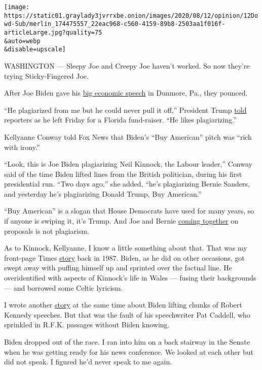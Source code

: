 \texttt{[image: https://static01.graylady3jvrrxbe.onion/images/2020/08/12/opinion/12Dowd-Sub/merlin\_174475557\_22eac968-c560-4159-89b8-2503aa1f016f-articleLarge.jpg?quality=75\\\&auto=webp\\\&disable=upscale]}

WASHINGTON --- Sleepy Joe and Creepy Joe haven't worked. So now they're
trying Sticky-Fingered Joe.

After Joe Biden gave his
\href{https://www.nytimes3xbfgragh.onion/2020/07/09/us/politics/biden-buy-american.html}{big
economic speech} in Dunmore, Pa., they pounced.

``He plagiarized from me but he could never pull it off,'' President
Trump
\href{https://twitter.com/CBSNews/status/1281615665242214403?s=20}{told}
reporters as he left Friday for a Florida fund-raiser. ``He likes
plagiarizing.''

Kellyanne Conway told Fox News that Biden's ``Buy American'' pitch was
``rich with irony.''

``Look, this is Joe Biden plagiarizing Neil Kinnock, the Labour
leader,'' Conway said of the time Biden lifted lines from the British
politician, during his first presidential run. ``Two days ago,'' she
added, ``he's plagiarizing Bernie Sanders, and yesterday he's
plagiarizing Donald Trump, Buy American.''

``Buy American'' is a slogan that House Democrats have used for many
years, so if anyone is swiping it, it's Trump. And Joe and Bernie
\href{https://www.nytimes3xbfgragh.onion/2020/07/08/us/politics/biden-bernie-sanders.html}{coming
together} on proposals is not plagiarism.

As to Kinnock, Kellyanne, I know a little something about that. That was
my front-page Times
\href{https://www.nytimes3xbfgragh.onion/1987/09/12/us/biden-s-debate-finale-an-echo-from-abroad.html}{story}
back in 1987. Biden, as he did on other occasions, got swept away with
puffing himself up and sprinted over the factual line. He overidentified
with aspects of Kinnock's life in Wales --- fusing their backgrounds ---
and borrowed some Celtic lyricism.

I wrote another
\href{https://www.nytimes3xbfgragh.onion/1987/09/16/us/biden-is-facing-growing-debate-on-his-speeches.html}{story}
at the same time about Biden lifting chunks of Robert Kennedy speeches.
But that was the fault of his speechwriter Pat Caddell, who sprinkled in
R.F.K. passages without Biden knowing.

Biden dropped out of the race. I ran into him on a back stairway in the
Senate when he was getting ready for his news conference. We looked at
each other but did not speak. I figured he'd never speak to me again.

